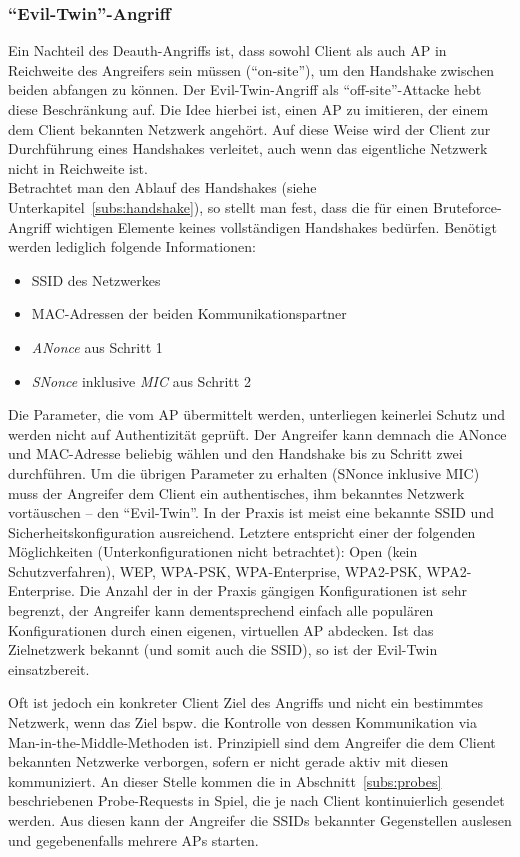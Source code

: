 \subsubsection{\enquote{Evil-Twin}-Angriff}\label{subs:evil-twin-attack}
Ein Nachteil des Deauth-Angriffs ist, dass sowohl Client als auch AP in Reichweite des Angreifers sein müssen (\enquote{on-site}), um den Handshake zwischen beiden abfangen zu können. Der Evil-Twin-Angriff als \enquote{off-site}-Attacke hebt diese Beschränkung auf. Die Idee hierbei ist, einen AP zu imitieren, der einem dem Client bekannten Netzwerk angehört. Auf diese Weise wird der Client zur Durchführung eines Handshakes verleitet, auch wenn das eigentliche Netzwerk nicht in Reichweite ist.\\

Betrachtet man den Ablauf des Handshakes (siehe Unterkapitel~\ref{subs:handshake}), so stellt man fest, dass die für einen Bruteforce-Angriff wichtigen Elemente keines vollständigen Handshakes bedürfen. Benötigt werden lediglich folgende Informationen:
\begin{itemize}
	\item SSID des Netzwerkes 
	\item MAC-Adressen der beiden Kommunikationspartner
	\item \textit{ANonce} aus Schritt 1
	\item \textit{SNonce} inklusive \textit{MIC} aus Schritt 2
\end{itemize}
Die Parameter, die vom AP übermittelt werden, unterliegen keinerlei Schutz und werden nicht auf Authentizität geprüft.
Der Angreifer kann demnach die ANonce und MAC-Adresse beliebig wählen und den Handshake bis zu Schritt zwei durchführen.
Um die übrigen Parameter zu erhalten (SNonce inklusive MIC) muss der Angreifer dem Client ein authentisches, ihm bekanntes Netzwerk vortäuschen -- den \enquote{Evil-Twin}. In der Praxis ist meist eine bekannte SSID und Sicherheitskonfiguration ausreichend. Letztere entspricht einer der folgenden Möglichkeiten (Unterkonfigurationen nicht betrachtet): Open (kein Schutzverfahren), WEP, WPA-PSK, WPA-Enterprise, WPA2-PSK, WPA2-Enterprise.
Die Anzahl der in der Praxis gängigen Konfigurationen ist sehr begrenzt, der Angreifer kann dementsprechend einfach alle populären Konfigurationen durch einen eigenen, virtuellen AP abdecken. Ist das Zielnetzwerk bekannt (und somit auch die SSID), so ist der Evil-Twin einsatzbereit.

Oft ist jedoch ein konkreter Client Ziel des Angriffs und nicht ein bestimmtes Netzwerk, wenn das Ziel bspw. die Kontrolle von dessen Kommunikation via Man-in-the-Middle-Methoden ist. Prinzipiell sind dem Angreifer die dem Client bekannten Netzwerke verborgen, sofern er nicht gerade aktiv mit diesen kommuniziert.
An dieser Stelle kommen die in Abschnitt~\ref{subs:probes} beschriebenen Probe-Requests in Spiel, die je nach Client kontinuierlich gesendet werden.
Aus diesen kann der Angreifer die SSIDs bekannter Gegenstellen auslesen und gegebenenfalls mehrere APs starten.

